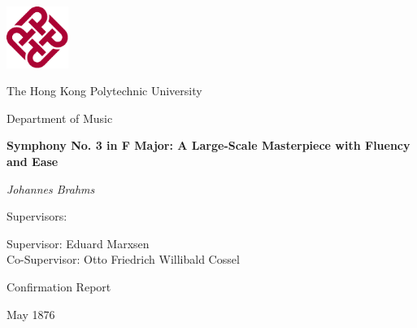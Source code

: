 \thispagestyle{empty}

\vspace*{1cm}

\begin{center}
\includegraphics[height=2cm]{Polyu logo.pdf}
\end{center}

\begin{center}

\vspace{1cm}
{\Large The Hong Kong Polytechnic University}

\vspace{0.5cm}
{\large Department of Music}

\vspace{2cm}
{\Large \textbf{
Symphony No. 3 in F Major: A Large-Scale Masterpiece with Fluency and Ease
}}

\vspace{2cm}
{\large \textit{Johannes Brahms}}

\vspace{2cm}
{\large Supervisors:}

\vspace{0.5cm}
{\large Supervisor: Eduard Marxsen} \\
{\large Co-Supervisor: Otto Friedrich Willibald Cossel}

\vspace{2cm}
{\large Confirmation Report}

\vspace{0.5cm}
{\large May 1876}

\end{center}
